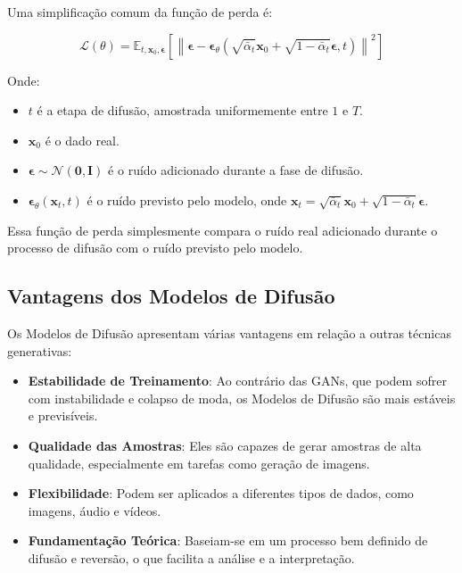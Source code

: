 \documentclass{tufte-handout}
\begin{document}
Uma simplificação comum da função de perda é:

\begin{equation}
    \mathcal{L}(\theta) = \mathbb{E}_{t, \mathbf{x}_0, \boldsymbol{\epsilon}} \left[ \left\| \boldsymbol{\epsilon} - \boldsymbol{\epsilon}_\theta(\sqrt{\bar{\alpha}_t} \mathbf{x}_0 + \sqrt{1 - \bar{\alpha}_t} \boldsymbol{\epsilon}, t) \right\|^2 \right]
\end{equation}

Onde:
\begin{itemize}
    \item $t$ é a etapa de difusão, amostrada uniformemente entre $1$ e $T$.
    \item $\mathbf{x}_0$ é o dado real.
    \item $\boldsymbol{\epsilon} \sim \mathcal{N}(\mathbf{0}, \mathbf{I})$ é o ruído adicionado durante a fase de difusão.
    \item $\boldsymbol{\epsilon}_\theta(\mathbf{x}_t, t)$ é o ruído previsto pelo modelo, onde $\mathbf{x}_t = \sqrt{\bar{\alpha}_t} \mathbf{x}_0 + \sqrt{1 - \bar{\alpha}_t} \boldsymbol{\epsilon}$.
\end{itemize}

Essa função de perda simplesmente compara o ruído real adicionado durante o processo de difusão com o ruído previsto pelo modelo.

\subsection{Vantagens dos Modelos de Difusão}

Os Modelos de Difusão apresentam várias vantagens em relação a outras técnicas generativas:
\begin{itemize}
    \item \textbf{Estabilidade de Treinamento}: Ao contrário das GANs, que podem sofrer com instabilidade e colapso de moda, os Modelos de Difusão são mais estáveis e previsíveis.
    \item \textbf{Qualidade das Amostras}: Eles são capazes de gerar amostras de alta qualidade, especialmente em tarefas como geração de imagens.
    \item \textbf{Flexibilidade}: Podem ser aplicados a diferentes tipos de dados, como imagens, áudio e vídeos.
    \item \textbf{Fundamentação Teórica}: Baseiam-se em um processo bem definido de difusão e reversão, o que facilita a análise e a interpretação.
\end{itemize}
\end{document}
